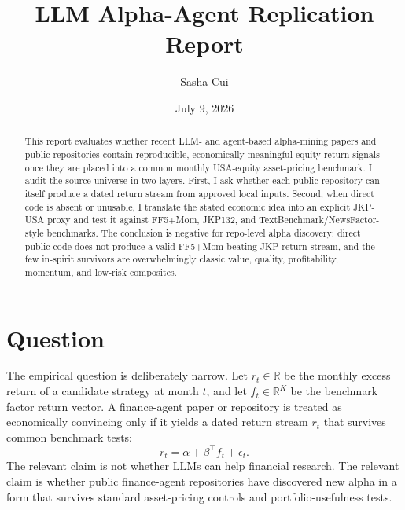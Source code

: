 \documentclass[11pt]{article}
\title{LLM Alpha-Agent Replication Report}
\author{Sasha Cui}
\date{July 9, 2026}
\begin{document}
\maketitle

\begin{center}
\end{center}

\begin{abstract}
This report evaluates whether recent LLM- and agent-based alpha-mining papers and
public repositories contain reproducible, economically meaningful equity return
signals once they are placed into a common monthly USA-equity asset-pricing
benchmark. I audit the source universe in two layers. First, I ask whether each
public repository can itself produce a dated return stream from approved local
inputs. Second, when direct code is absent or unusable, I translate the stated
economic idea into an explicit JKP-USA proxy and test it against FF5+Mom,
JKP132, and TextBenchmark/NewsFactor-style benchmarks. The conclusion is
negative for repo-level alpha discovery: direct public code does not produce a
valid FF5+Mom-beating JKP return stream, and the few in-spirit survivors are
overwhelmingly classic value, quality, profitability, momentum, and low-risk
composites.
\end{abstract}

\section{Question}

The empirical question is deliberately narrow. Let \(r_t\in\mathbb{R}\) be the
monthly excess return of a candidate strategy at month \(t\), and let
\(f_t\in\mathbb{R}^{K}\) be the benchmark factor return vector. A finance-agent
paper or repository is treated as economically convincing only if it yields a
dated return stream \(r_t\) that survives common benchmark tests:
\[
  r_t = \alpha + \beta^\top f_t + \epsilon_t.
\]
The relevant claim is not whether LLMs can help financial research. The relevant
claim is whether public finance-agent repositories have discovered new alpha in a
form that survives standard asset-pricing controls and portfolio-usefulness
tests.
\end{document}
